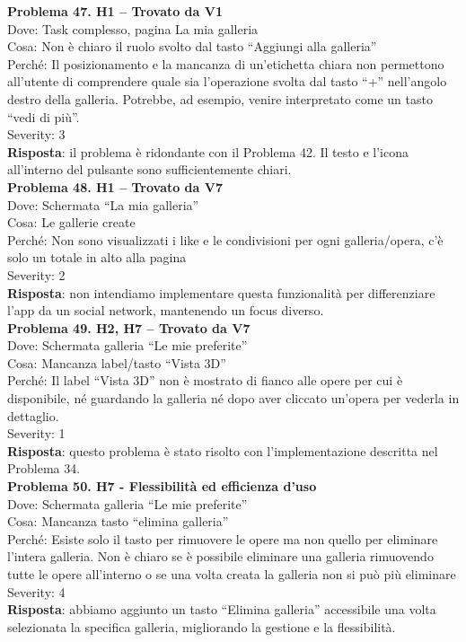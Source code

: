 \documentclass{article}
\begin{document}
\noindent \textbf{Problema 47. H1 – Trovato da V1} \\
Dove: Task complesso, pagina La mia galleria \\
Cosa: Non è chiaro il ruolo svolto dal tasto “Aggiungi alla galleria” \\
Perché: Il posizionamento e la mancanza di un’etichetta chiara non permettono all’utente di comprendere quale sia l’operazione svolta dal tasto “+” nell’angolo destro della galleria. Potrebbe, ad esempio, venire interpretato come un tasto “vedi di più”. \\
Severity: 3 \\
\textbf{Risposta}: il problema è ridondante con il Problema 42. Il testo e l’icona all’interno del pulsante sono sufficientemente chiari.\\

\noindent \textbf{Problema 48. H1 – Trovato da V7} \\
Dove: Schermata “La mia galleria” \\
Cosa: Le gallerie create \\
Perché: Non sono visualizzati i like e le condivisioni per ogni galleria/opera, c’è solo un totale in alto alla pagina \\
Severity: 2 \\
\textbf{Risposta}: non intendiamo implementare questa funzionalità per differenziare l’app da un social network, mantenendo un focus diverso.\\

\noindent \textbf{Problema 49. H2, H7 – Trovato da V7} \\
Dove: Schermata galleria “Le mie preferite” \\
Cosa: Mancanza label/tasto “Vista 3D” \\
Perché: Il label “Vista 3D” non è mostrato di fianco alle opere per cui è disponibile, né guardando la galleria né dopo aver cliccato un’opera per vederla in dettaglio. \\
Severity: 1 \\
\textbf{Risposta}: questo problema è stato risolto con l’implementazione descritta nel Problema 34.\\

\noindent \textbf{Problema 50. H7 - Flessibilità ed efficienza d’uso} \\
Dove: Schermata galleria “Le mie preferite” \\
Cosa: Mancanza tasto “elimina galleria” \\
Perché: Esiste solo il tasto per rimuovere le opere ma non quello per eliminare l’intera galleria. Non è chiaro se è possibile eliminare una galleria rimuovendo tutte le opere all’interno o se una volta creata la galleria non si può più eliminare \\
Severity: 4 \\
\textbf{Risposta}: abbiamo aggiunto un tasto “Elimina galleria” accessibile una volta selezionata la specifica galleria, migliorando la gestione e la flessibilità.\\
\end{document}
